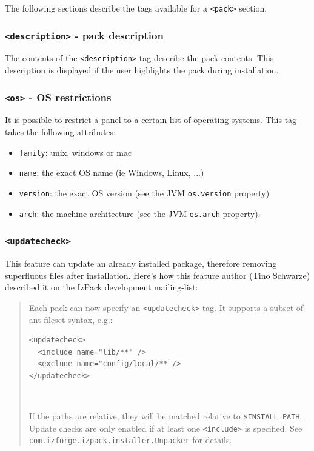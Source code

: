 The following sections describe the tags available for a \texttt{<pack>} section.

\subsubsection{\texttt{<description>} - pack description}

The contents of the \texttt{<description>} tag describe the pack contents.
This description is displayed if the user highlights the pack during 
installation.

\subsubsection{\texttt{<os>} - OS restrictions}

It is possible to restrict a panel to a certain list of operating systems. This
tag takes the following attributes:
\begin{itemize}
\item \texttt{family}: unix, windows or mac
\item \texttt{name}: the exact OS name (ie Windows, Linux, ...)
\item \texttt{version}: the exact OS version (see the JVM \texttt{os.version} property)
\item \texttt{arch}: the machine architecture (see the JVM \texttt{os.arch} property).
\end{itemize}

\subsubsection{\texttt{<updatecheck>}}

This feature can update an already installed package, therefore removing
superfluous files after installation. Here's how this feature author (Tino Schwarze)
described it on the IzPack development mailing-list:
\begin{quote}
Each pack can now
specify an \texttt{<updatecheck>} tag. It supports a subset of ant fileset
syntax, e.g.:
\begin{verbatim}
<updatecheck>
  <include name="lib/**" />
  <exclude name="config/local/** />
</updatecheck>
\end{verbatim}\

If the paths are relative, they will be matched relative to
\texttt{\$INSTALL\_PATH}. Update checks are only enabled if at least one
\texttt{<include>} is specified. See
\texttt{com.izforge.izpack.installer.Unpacker} for details.
\end{quote}

